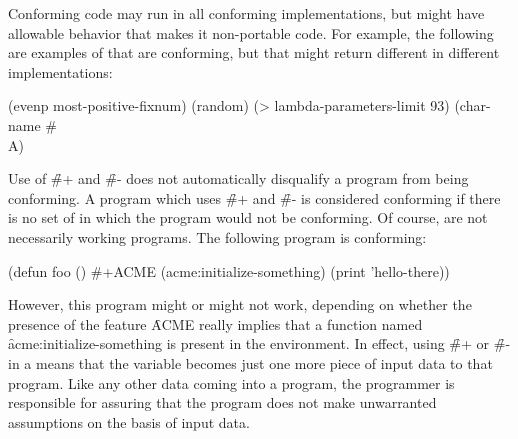  
Conforming code may run in all conforming implementations, but might
have allowable  behavior that makes it
non-portable code.
For example, the following are examples of  that are conforming, but
that might return different  in different implementations:

\code
 (evenp most-positive-fixnum) \EV {}
 (random) \EV {}
 (> lambda-parameters-limit 93) \EV {}
 (char-name #\\A) \EV {}
\endcode 



Use of \f{\#+} and \f{\#-} does not automatically disqualify a program
from being conforming.  A program which uses \f{\#+} and \f{\#-} is 
considered conforming if there is no set of  in which the
program would not be conforming.  Of course,  are
not necessarily working programs.  The following program is conforming:

\code
(defun foo ()
  \#+ACME (acme:initialize-something)
  (print 'hello-there))
\endcode

However, this program might or might not work, depending on whether the
presence of the feature \f{ACME} really implies that a function named
\f{acme:initialize-something} is present in the environment.  In effect,
using \f{\#+} or \f{\#-} in a  means that the variable
becomes just one more piece of input data to that 
program.  Like any other data coming into a program, the programmer
is responsible for assuring that the program does not make unwarranted
assumptions on the basis of input data.


